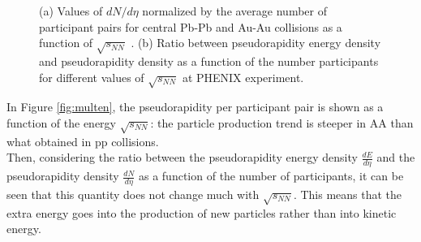 \begin{figure}
  \caption{(a) Values of $dN/d\eta$ normalized by the average number of participant pairs for central Pb-Pb and Au-Au collisions as a function of $\sqrt{s_{NN}}$ \cite{multen}. (b) Ratio between pseudorapidity energy density and pseudorapidity density as a function of the number participants for different values of $\sqrt{s_{NN}}$ at PHENIX experiment.}
\end{figure}
%
In Figure \ref{fig:multen}, the pseudorapidity per participant pair is shown as a function of the energy $\sqrt{s_{NN}}$: the particle production trend is steeper in AA than what obtained in pp collisions.\\
Then, considering the ratio between the pseudorapidity energy density $\frac{dE}{d\eta}$ and  the pseudorapidity density $\frac{dN}{d\eta}$ as a function of the number of participants, it can be seen that this quantity does not change much with $\sqrt{s_{NN}}$. This means that the extra energy goes into the production of new particles rather than into kinetic energy.
%
